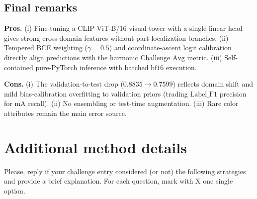 \documentclass[a4paper, 10pt, conference]{ieeeconf}
\begin{document}
\subsection{Final remarks}
\textbf{Pros.} (i) Fine-tuning a CLIP ViT-B/16 visual tower with a single linear head gives strong cross-domain features without part-localization branches. (ii) Tempered BCE weighting ($\gamma=0.5$) and coordinate-ascent logit calibration directly align predictions with the harmonic $\text{Challenge\_Avg}$ metric. (iii) Self-contained pure-PyTorch inference with batched $\text{bf16}$ execution.

\textbf{Cons.} (i) The validation-to-test drop ($0.8835\to0.7599$) reflects domain shift and mild bias-calibration overfitting to validation priors (trading $\text{Label\_F1}$ precision for $\text{mA}$ recall). (ii) No ensembling or test-time augmentation. (iii) Rare color attributes remain the main error source.

\section{Additional method details}
Please, reply if your challenge entry considered (or not) the following strategies and provide a brief explanation. For each question, mark with X one single option. \\

%
%
\end{document}
